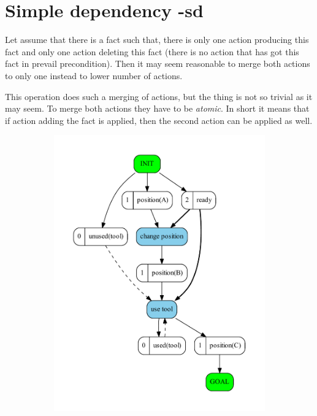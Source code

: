 
	\chapter{Simple dependency -sd}
	Let assume that there is a fact such that, there is only one action producing this fact and only one action deleting this fact (there is no action that has got this fact in prevail precondition). Then it may seem reasonable to merge both actions to only one instead to lower number of actions. 
	
	This operation does such a merging of actions, but the thing is not so trivial as it may seem. To merge both actions they have to be \emph{atomic}. In short it means that if action adding the fact is applied, then the second action can be applied as well. 
	
	\begin{figure}
		\begin{subfigure}[b]{0.4\textwidth}
			\includegraphics[scale=0.4]{simpleDependency/figures/simple_input}

\end{subfigure}
\end{figure}
